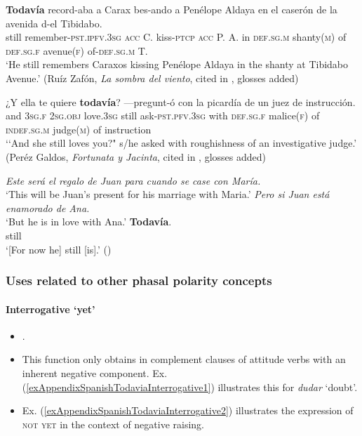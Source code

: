 \begin{exe}
	\ex
	\gll \textbf{Todavía} record-aba a Carax bes-ando a Penélope Aldaya en el caserón de la avenida d-el Tibidabo.\\
	still remember-\textsc{pst}.\textsc{ipfv}.3\textsc{sg} \textsc{acc} C. kiss-\textsc{ptcp} \textsc{acc} P. A. in \textsc{def}.\textsc{sg}.\textsc{m} 	shanty(\textsc{m}) of \textsc{def}.\textsc{sg}.\textsc{f} avenue(\textsc{f}) of-\textsc{def}.\textsc{sg}.\textsc{m} T.\\
	\glt \lq He still remembers Caraxos kissing Penélope Aldaya in the shanty at Tibidabo Avenue.' (Ruíz Zafón, \textit{La sombra del viento}, cited in \cite[§30.8.f]{RAEGramatica}, glosses added)

\ex
\gll ¿Y ella te quiere \textbf{todavía}? —pregunt-ó con la picardía de un juez de instrucción.\\
\phantom{¿}and 3\textsc{sg}.\textsc{f} 2\textsc{sg}.\textsc{obj} love.3\textsc{sg} still  \phantom{—}ask-\textsc{pst}.\textsc{pfv}.3\textsc{sg} with \textsc{def}.\textsc{sg}.\textsc{f} malice(\textsc{f}) of \textsc{indef}.\textsc{sg}.\textsc{m} judge(\textsc{m}) of instruction\\
\glt \lq\lq And she still loves you?" s/he asked with roughishness of an investigative judge.' (Peréz Galdos, \textit{Fortunata y Jacinta}, cited in \cite[§30.8.f]{RAEGramatica}, glosses added)

	\ex\label{exAppendixSpanishTodavia3}
	\begin{xlist}
		\textit{Este será el regalo de Juan para cuando se case con María.}\\
		\lq This will be Juan’s present for his marriage with Maria.'
		 \textit{Pero si Juan está enamorado de Ana.}\\
		\glt \lq But he is in love with Ana.'
		 \gll \textbf{Todavía}.\\
		still\\
		\glt \lq [For now he] still [is].' (\cite[10]{EderlyCurco2016})
	\end{xlist}
\end{exe}

\subsubsection{Uses related to other phasal polarity concepts}
\paragraph{Interrogative \lq yet\rq}
\label{appendixSpanishTodaviaInterrogativeYet}
\begin{itemize}
	\item \textcite[§30.8m]{RAEGramatica}.
	\item This function only obtains in complement clauses of attitude verbs with an inherent negative component.	 Ex. (\ref{exAppendixSpanishTodaviaInterrogative1}) illustrates this for \textit{dudar} \lq doubt'.
	\item Ex. (\ref{exAppendixSpanishTodaviaInterrogative2}) illustrates the expression of \textsc{not yet} in the context of negative raising.
\end{itemize}

